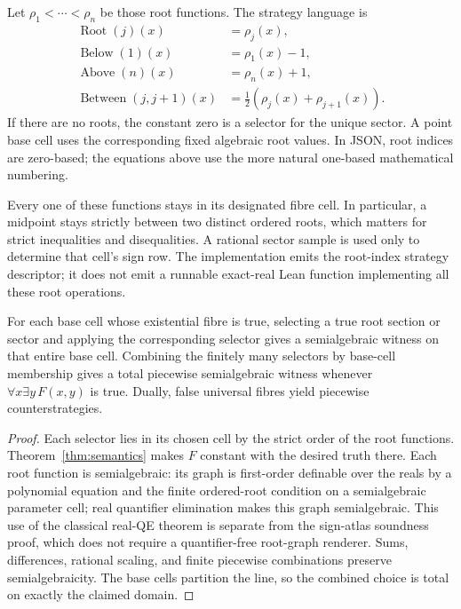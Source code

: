 Let $\rho_1<\cdots<\rho_n$ be those root functions. The strategy language is
\begin{align*}
 \operatorname{Root}(j)(x)&=\rho_j(x),\\
 \operatorname{Below}(1)(x)&=\rho_1(x)-1,\\
 \operatorname{Above}(n)(x)&=\rho_n(x)+1,\\
 \operatorname{Between}(j,j+1)(x)&=\tfrac12(\rho_j(x)+\rho_{j+1}(x)).
\end{align*}
If there are no roots, the constant zero is a selector for the unique sector. A point base cell uses the corresponding fixed algebraic root values. In JSON, root indices are zero-based; the equations above use the more natural one-based mathematical numbering.

Every one of these functions stays in its designated fibre cell. In particular, a midpoint stays strictly between two distinct ordered roots, which matters for strict inequalities and disequalities. A rational sector sample is used only to determine that cell's sign row. The implementation emits the root-index strategy descriptor; it does not emit a runnable exact-real Lean function implementing all these root operations.

\begin{theorem}\label{thm:strategy}
For each base cell whose existential fibre is true, selecting a true root section or sector and applying the corresponding selector gives a semialgebraic witness on that entire base cell. Combining the finitely many selectors by base-cell membership gives a total piecewise semialgebraic witness whenever $\forall x\exists y\,F(x,y)$ is true. Dually, false universal fibres yield piecewise counterstrategies.
\end{theorem}
\begin{proof}
Each selector lies in its chosen cell by the strict order of the root functions. Theorem~\ref{thm:semantics} makes $F$ constant with the desired truth there. Each root function is semialgebraic: its graph is first-order definable over the reals by a polynomial equation and the finite ordered-root condition on a semialgebraic parameter cell; real quantifier elimination makes this graph semialgebraic. This use of the classical real-QE theorem is separate from the sign-atlas soundness proof, which does not require a quantifier-free root-graph renderer. Sums, differences, rational scaling, and finite piecewise combinations preserve semialgebraicity. The base cells partition the line, so the combined choice is total on exactly the claimed domain.
\end{proof}

